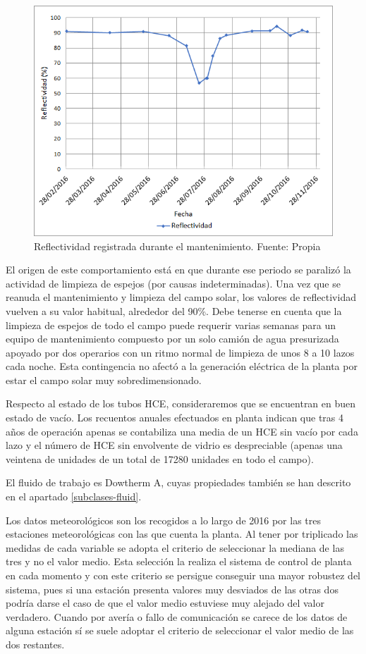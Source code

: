 \begin{figure}[H]
\includegraphics[width=0.9\linewidth]{images/reflectividad.png}
\caption{Reflectividad registrada durante el mantenimiento. Fuente: Propia} 
\label{fig:reflectividad}
\end{figure}

El origen de este comportamiento está en que durante ese periodo se paralizó la actividad de limpieza de espejos (por causas indeterminadas). Una vez que se reanuda el mantenimiento y limpieza del campo solar, los valores de reflectividad vuelven a su valor habitual, alrededor del 90\%. Debe tenerse en cuenta que la limpieza de espejos de todo el campo puede requerir varias semanas para un equipo de mantenimiento compuesto por un solo camión de agua presurizada apoyado por dos operarios con un ritmo normal de limpieza de unos 8 a 10 lazos cada noche. Esta contingencia no afectó a la generación eléctrica de la planta por estar el campo solar muy sobredimensionado.

Respecto al estado de los tubos HCE, consideraremos que se encuentran en buen estado de vacío. Los recuentos anuales efectuados en planta indican que tras 4 años de operación apenas se contabiliza una media de un HCE sin vacío por cada lazo y el número de HCE sin envolvente de vidrio es despreciable (apenas una veintena de unidades de un total de 17280 unidades en todo el campo).

El fluido de trabajo es Dowtherm A, cuyas propiedades también se han descrito en el apartado \ref{subclases-fluid}.

Los datos meteorológicos son los recogidos a lo largo de 2016 por las tres estaciones meteorológicas con las que cuenta la planta. Al tener por triplicado las medidas de cada variable se adopta el criterio de seleccionar la mediana de las tres y no el valor medio. Esta selección la realiza el sistema de control de planta en cada momento y con este criterio se persigue conseguir una mayor robustez del sistema, pues si una estación presenta valores muy desviados de las otras dos podría darse el caso de que el valor medio estuviese muy alejado del valor  verdadero. Cuando por avería o fallo de comunicación se carece de los datos de alguna estación sí se suele adoptar el criterio de seleccionar el valor medio de las dos restantes.

